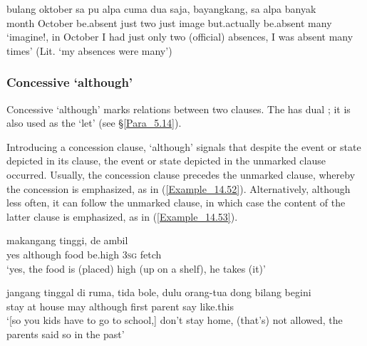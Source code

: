 \ea
\label{Example_14.51}
\gll bulang  oktober  sa  pu  alpa  cuma  dua  saja,  bayangkang,   sa  alpa  banyak\\  
month  October      be.absent  just  two  just  image but.actually    be.absent  many\\
 ‘imagine!, in October I had just only two (official) absences,  I was absent many times’ (Lit. ‘my absences were many’) \textstyleExampleSource{[081023-004-Cv.0014]}
\z

\subsubsection[Concessive biar ‘although’]{Concessive  ‘although’}
\label{Para_14.2.5.4}
Concessive  ‘although’ marks  relations between two clauses. The  has dual ; it is also used as the    ‘let’ (see §\ref{Para_5.14}).

Introducing a concession clause,  ‘although’ signals that despite the event or state depicted in its clause, the event or state depicted in the unmarked clause occurred. Usually, the concession clause precedes the unmarked clause, whereby the concession is emphasized, as in (\ref{Example_14.52}). Alternatively, although less often, it can follow the unmarked clause, in which case the content of the latter clause is emphasized, as in (\ref{Example_14.53}).


\ea
\label{Example_14.52}
 {} {makangang} {tinggi,} {de} {ambil}\\ %
 yes  although  food  be.high  \textsc{3sg}  fetch\\
 ‘yes,  the food is (placed) high (up on a shelf), he takes (it)’ \textstyleExampleSource{[081025-006-Cv.0254]}
\z

\ea
\label{Example_14.53}

\gll {\ldots}  jangang  tinggal  di  ruma,  tida  bole,    dulu   orang-tua  dong  bilang  begini\\  
{}   stay  at  house    may  although  first parent    say  like.this\\
\glt ‘[so you kids have to go to school,] don’t stay home, (that’s) not allowed,  the parents said so in the past’ \textstyleExampleSource{[081110-008-CvNP.0036]}
\z

